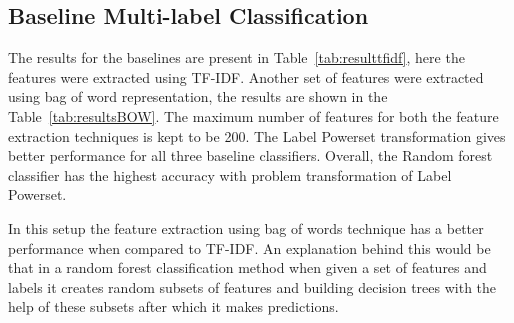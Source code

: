 
\subsection{Baseline Multi-label Classification}
The results for the baselines are present in Table~\ref{tab:resulttfidf}, here the features were extracted using TF-IDF. Another set of features were extracted using bag of word representation, the results are shown in the Table~\ref{tab:resultsBOW}. The maximum number of features for both the feature extraction techniques is kept to be 200. 
The Label Powerset transformation gives better performance for all three baseline classifiers. Overall, the Random forest classifier has the highest accuracy with problem transformation of Label Powerset. 

In this setup the feature extraction using bag of words technique has a better performance when compared to TF-IDF. An explanation behind this would be that in a random forest classification method when given a set of features and labels it creates random subsets of features and building decision trees with the help of these subsets after which it makes predictions. 


